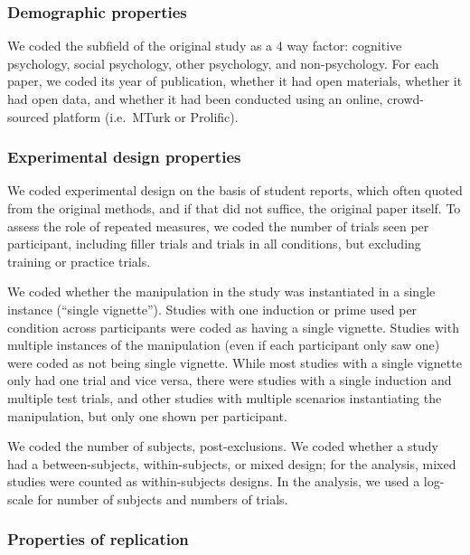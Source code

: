 \documentclass[
  english,
  a4paper,
]{article}
\begin{document}
\hypertarget{demographic-properties}{%
\subsubsection{Demographic properties}\label{demographic-properties}}

We coded the subfield of the original study as a 4 way factor: cognitive psychology, social psychology, other psychology, and non-psychology. For each paper, we coded its year of publication, whether it had open materials, whether it had open data, and whether it had been conducted using an online, crowd-sourced platform (i.e.~MTurk or Prolific).

\hypertarget{experimental-design-properties}{%
\subsubsection{Experimental design properties}\label{experimental-design-properties}}

We coded experimental design on the basis of student reports, which often quoted from the original methods, and if that did not suffice, the original paper itself. To assess the role of repeated measures, we coded the number of trials seen per participant, including filler trials and trials in all conditions, but excluding training or practice trials.

We coded whether the manipulation in the study was instantiated in a single instance (``single vignette''). Studies with one induction or prime used per condition across participants were coded as having a single vignette. Studies with multiple instances of the manipulation (even if each participant only saw one) were coded as not being single vignette. While most studies with a single vignette only had one trial and vice versa, there were studies with a single induction and multiple test trials, and other studies with multiple scenarios instantiating the manipulation, but only one shown per participant.

We coded the number of subjects, post-exclusions. We coded whether a study had a between-subjects, within-subjects, or mixed design; for the analysis, mixed studies were counted as within-subjects designs. In the analysis, we used a log-scale for number of subjects and numbers of trials.

\hypertarget{properties-of-replication}{%
\subsubsection{Properties of replication}\label{properties-of-replication}}
\end{document}
